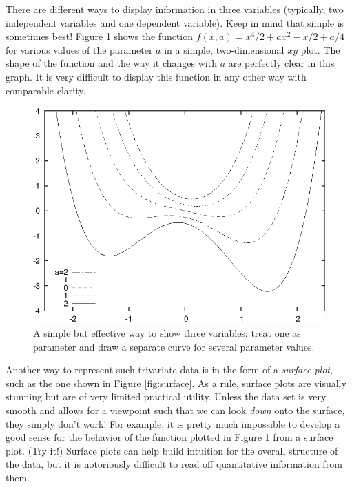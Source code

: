
There are different ways to display information in three variables
(typically, two independent variables and one dependent variable).
Keep in mind that simple is sometimes best! Figure \ref{fig:landau}
shows the function $f(x,a) = x^4/2 + a x^2 - x/2 + a/4$ for various
values of the parameter $a$ in a simple, two-dimensional $xy$ plot.
The shape of the function and the way it changes with $a$ are
perfectly clear in this graph. It is very difficult to display this
function in any other way with comparable clarity.

\begin{figure}
   \centerline{\includegraphics{img/landau}}
  \caption{A simple but effective way to show three variables: treat 
    one as parameter and draw a separate curve for several parameter
    values.}
  \label{fig:landau}\vspace*{12pt}
\end{figure}

Another way to represent such trivariate data is in the form of a
\emph{surface plot},  such as the one shown in Figure
\ref{fig:surface}.  As a rule, surface plots are visually stunning but
are of very limited practical utility. Unless the data set is very
smooth and allows for a viewpoint such that we can look \emph{down}
onto the surface, they simply don't work! For example, it is pretty
much impossible to develop a good sense for the behavior of the
function plotted in Figure \ref{fig:landau} from a surface plot. (Try
it!)  Surface plots can help build intuition for the overall
structure of the data, but it is notoriously difficult to read off
quantitative information from them.

